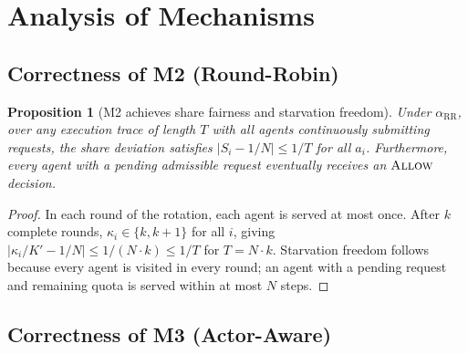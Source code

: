 \documentclass[11pt]{article}
\theoremstyle{plain}
\newtheorem{proposition}[theorem]{Proposition}
\theoremstyle{definition}
\theoremstyle{remark}
\newcommand{\Allow}{\textsc{Allow}}
\newcommand{\Share}[1]{S_{#1}}             %
\newcommand{\Kcap}{K}                      %
\newcommand{\alloc}{\alpha}                %
\begin{document}
\section{Analysis of Mechanisms}
\label{sec:analysis}

%
%
%
%
%

\subsection{Correctness of M2 (Round-Robin)}

\begin{proposition}[M2 achieves share fairness and starvation freedom]
\label{prop:m2}
Under $\alloc_{\mathrm{RR}}$, over any execution trace of length
$T$ with all agents continuously submitting requests, the share
deviation satisfies $|\Share{i} - 1/N| \leq 1/T$ for all $a_i$.
Furthermore, every agent with a pending admissible request eventually
receives an $\Allow$ decision.
\end{proposition}

\begin{proof}
In each round of the rotation, each agent is served at most once.  After
$k$ complete rounds, $\kappa_i \in \{k, k+1\}$ for all $i$, giving
$|\kappa_i/\Kcap' - 1/N| \leq 1/(N \cdot k) \leq 1/T$ for $T = N
\cdot k$.  Starvation freedom follows because every agent is visited in
every round; an agent with a pending request and remaining quota is
served within at most $N$ steps.
\end{proof}

\subsection{Correctness of M3 (Actor-Aware)}
\end{document}
